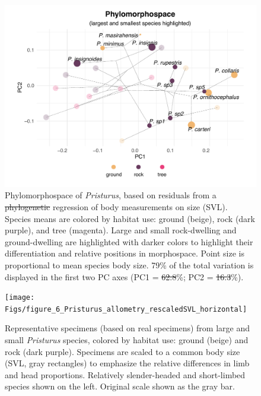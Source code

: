 \documentclass[
  11pt,
]{article}
\providecommand{\DIFaddtex}[1]{{\protect\color{blue}\uwave{#1}}} %
\providecommand{\DIFdeltex}[1]{{\protect\color{red}\sout{#1}}}                      %
\providecommand{\DIFaddFL}[1]{\DIFadd{#1}} %
\providecommand{\DIFdelFL}[1]{\DIFdel{#1}} %
\providecommand{\DIFaddbeginFL}{} %
\providecommand{\DIFaddendFL}{} %
\providecommand{\DIFdelbeginFL}{} %
\providecommand{\DIFdelendFL}{} %
\providecommand{\DIFadd}[1]{\texorpdfstring{\DIFaddtex{#1}}{#1}} %
\providecommand{\DIFdel}[1]{\texorpdfstring{\DIFdeltex{#1}}{}} %
\newcommand{\DIFscaledelfig}{0.5}
\newlength{\DIFdelgraphicswidth} %
\newlength{\DIFdelgraphicsheight} %
\newcommand{\DIFaddincludegraphics}[2][]{{\color{blue}\fbox{\DIFOincludegraphics[#1]{#2}}}} %
\newcommand{\DIFdelincludegraphics}[2][]{%
\sbox{\DIFdelgraphicsbox}{\DIFOincludegraphics[#1]{#2}}%
\settoboxwidth{\DIFdelgraphicswidth}{\DIFdelgraphicsbox} %
\settoboxtotalheight{\DIFdelgraphicsheight}{\DIFdelgraphicsbox} %
\scalebox{\DIFscaledelfig}{%
\parbox[b]{\DIFdelgraphicswidth}{\usebox{\DIFdelgraphicsbox}\\[-\baselineskip] \rule{\DIFdelgraphicswidth}{0em}}\llap{\resizebox{\DIFdelgraphicswidth}{\DIFdelgraphicsheight}{%
\setlength{\unitlength}{\DIFdelgraphicswidth}%
\begin{picture}(1,1)%
\thicklines\linethickness{2pt} %
{\color[rgb]{1,0,0}\put(0,0){\framebox(1,1){}}}%
{\color[rgb]{1,0,0}\put(0,0){\line( 1,1){1}}}%
{\color[rgb]{1,0,0}\put(0,1){\line(1,-1){1}}}%
\end{picture}%
}\hspace*{3pt}}} %
} %
\DeclareRobustCommand{\DIFaddbeginFL}{\DIFOaddbeginFL \let\includegraphics\DIFaddincludegraphics} %
\DeclareRobustCommand{\DIFaddendFL}{\DIFOaddendFL \let\includegraphics\DIFOincludegraphics} %
\DeclareRobustCommand{\DIFdelbeginFL}{\DIFOdelbeginFL \let\includegraphics\DIFdelincludegraphics} %
\DeclareRobustCommand{\DIFdelendFL}{\DIFOaddendFL \let\includegraphics\DIFOincludegraphics} %
\begin{document}
\begin{figure}

{\centering \DIFdelbeginFL %
\DIFdelendFL \DIFaddbeginFL \includegraphics[width=1\linewidth]{Figs/figure_5_new_phylomorphospace_v2} 
\DIFaddendFL 

}

\caption{Phylomorphospace of \textit{Pristurus}, based on residuals from a \DIFdelbeginFL \DIFdelFL{phylogenetic }\DIFdelendFL \DIFaddbeginFL \DIFaddFL{non-phylogenetic }\DIFaddendFL regression of body measurements on size (SVL). Species means are colored by habitat use: ground (beige), rock (dark purple), and tree (magenta). Large and small rock-dwelling and ground-dwelling are highlighted with darker colors to highlight their differentiation and relative positions in morphospace. Point size is proportional to mean species body size. 79\% of the total variation is displayed in the first two PC axes (PC1 = \DIFdelbeginFL \DIFdelFL{62.8}\DIFdelendFL \DIFaddbeginFL \DIFaddFL{63}\DIFaddendFL \%; PC2 = \DIFdelbeginFL \DIFdelFL{16.3}\DIFdelendFL \DIFaddbeginFL \DIFaddFL{16}\DIFaddendFL \%).}\DIFdelbeginFL %
\DIFdelendFL \DIFaddbeginFL \label{fig:unnamed-chunk-9}
\DIFaddendFL \end{figure}

\newpage

\begin{figure}

{\centering \texttt{[image: Figs/figure\_6\_Pristurus\_allometry\_rescaledSVL\_horizontal]} 

}

\caption{Representative specimens (based on real specimens) from large and small \textit{Pristurus} species, colored by habitat use: ground (beige) and rock (dark purple). Specimens are scaled to a common body size (SVL, gray rectangles) to emphasize the relative differences in limb and head proportions. Relatively slender-headed and short-limbed species shown on the left. Original scale shown as the gray bar.}\DIFdelbeginFL %
\DIFdelendFL \DIFaddbeginFL \label{fig:unnamed-chunk-10}
\DIFaddendFL \end{figure}
\end{document}
